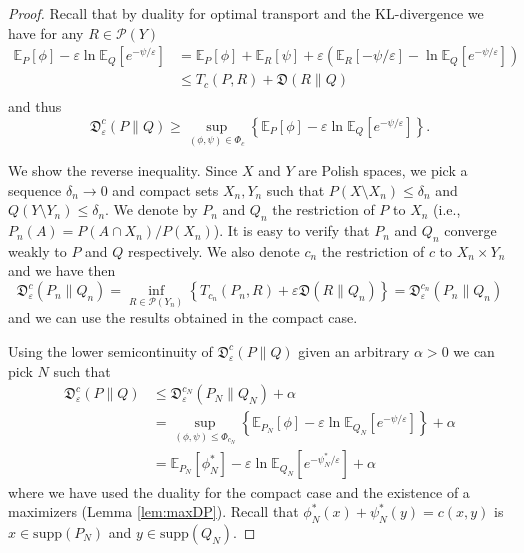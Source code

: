 \documentclass{amsart}
\theoremstyle{definition}
\theoremstyle{remark}
\numberwithin{equation}{section}
\begin{document}
\begin{proof}  Recall that by duality for optimal transport and the KL-divergence we 
have for any $R \in \mathcal{P}(Y)$
\begin{equation}
\begin{aligned}
\mathbb{E}_P[\phi] -\varepsilon \ln \mathbb{E}_Q[e^{-\psi/\varepsilon}] &=   \mathbb{E}_P[\phi] +\mathbb{E}_R[\psi] + \varepsilon \left(\mathbb{E}_R[-\psi/\varepsilon] -\ln \mathbb{E}_Q[e^{-\psi/\varepsilon}]\right) \\
&\le T_c(P,R) + \mathfrak{D}(R\|Q)\\
\end{aligned}
\end{equation}
and thus 
\begin{equation}
\mathfrak{D}^c_\varepsilon(P\|Q) \ge  \sup_{(\phi,\psi)\in \Phi_c} \left\{ \mathbb{E}_P[\phi] - \varepsilon\ln \mathbb{E}_Q[e^{-\psi/\varepsilon}] \right\}.
\end{equation}

We show the reverse inequality. Since $X$ and $Y$ are Polish spaces, we pick a sequence $\delta_n \to 0$ and compact sets $X_n,Y_n$ such that $P(X\setminus X_n) \le \delta_n$ and $Q(Y\setminus Y_n) \le \delta_n$.  We denote by $P_n$ and $Q_n$ the restriction of $P$ to $X_n$ (i.e., $P_n(A)=P(A \cap X_n)/P(X_n)$). It is easy to verify that $P_n$
and $Q_n$  converge weakly to $P$ and $Q$ respectively. We also denote $c_n$ the restriction of $c$ to $X_n\times Y_n$ 
and we have then 
\begin{equation}
\mathfrak{D}^c_\varepsilon(P_n\|Q_n) = \inf_{R \in \mathcal{P}(Y_n)} \left\{ T_{c_n}(P_n,R) + \varepsilon \mathfrak{D}(R\|Q_n)\right\} = \mathfrak{D}^{c_n}_\varepsilon(P_n\|Q_n)
\end{equation}
and we can use the results obtained in the compact case. 




Using the lower semicontinuity of  $\mathfrak{D}^c_\varepsilon(P\|Q)$ given an arbitrary $\alpha >0$ we can pick $N$ such that 
\begin{equation}\label{eq:tt23}
\begin{aligned}
\mathfrak{D}^c_\varepsilon(P\|Q)  &\le \mathfrak{D}^{c_N}_\varepsilon(P_N\|Q_N) + \alpha  \\
& = \sup_{(\phi,\psi)\le \Phi_{c_N}}
\left\{ \mathbb{E}_{P_N}[\phi] - \varepsilon\ln \mathbb{E}_{Q_N}[e^{-\psi/\varepsilon}] \right\} + \alpha\\
& = \mathbb{E}_{P_N}[\phi_N^*] - \varepsilon\ln \mathbb{E}_{Q_N}[e^{-\psi_N^*/\varepsilon}] + \alpha
\end{aligned}
\end{equation}
where we have used the duality for the compact case  and the existence of a maximizers (Lemma \ref{lem:maxDP}).  Recall that $\phi_N^*(x)+\psi_N^*(y)=c(x,y)$ is $x \in \textrm{supp}(P_N)$ and $y \in \textrm{supp}(Q_N)$.


\end{proof}
\end{document}
